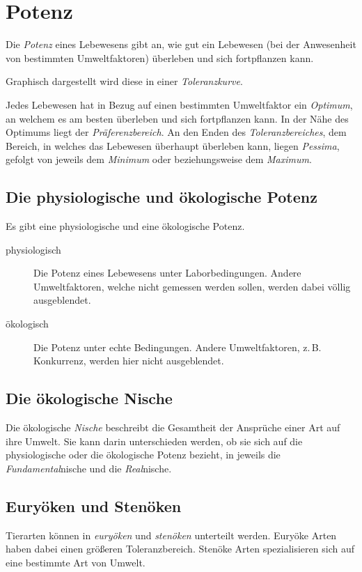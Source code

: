 \documentclass{article}
\begin{document}
\section{Potenz}
Die \emph{Potenz} eines Lebewesens gibt an, wie gut ein Lebewesen (bei der Anwesenheit von bestimmten Umweltfaktoren) überleben und sich fortpflanzen kann.
 
Graphisch dargestellt wird diese in einer \emph{Toleranzkurve}.
 
Jedes Lebewesen hat in Bezug auf einen bestimmten Umweltfaktor ein \emph{Optimum}, an welchem es am besten überleben und sich fortpflanzen kann. In der Nähe des Optimums liegt der \emph{Präferenzbereich}. An den Enden des \emph{Toleranzbereiches}, dem Bereich, in welches das Lebewesen überhaupt überleben kann, liegen \emph{Pessima}, gefolgt von jeweils dem \emph{Minimum} oder beziehungsweise dem \emph{Maximum}. 
 
\subsection{Die physiologische und ökologische Potenz}
Es gibt eine physiologische und eine ökologische Potenz.
\begin{description}
 \item[physiologisch] Die Potenz eines Lebewesens unter Laborbedingungen. Andere Umweltfaktoren, welche nicht gemessen werden sollen, werden dabei völlig ausgeblendet.
 \item[ökologisch] Die Potenz unter echte Bedingungen. Andere Umweltfaktoren, z.\,B. Konkurrenz, werden hier nicht ausgeblendet.
\end{description}  
 
\subsection{Die ökologische Nische}
Die ökologische \emph{Nische} beschreibt die Gesamtheit der Ansprüche einer Art auf ihre Umwelt. Sie kann darin unterschieden werden, ob sie sich auf die physiologische oder die ökologische Potenz bezieht, in jeweils die \emph{Fundamental}nische und die \emph{Real}nische.
 
\subsection{Euryöken und Stenöken}
Tierarten können in \emph{euryöken} und \emph{stenöken} unterteilt werden. Euryöke Arten haben dabei einen größeren Toleranzbereich. Stenöke Arten spezialisieren sich auf eine bestimmte Art von Umwelt.
 
\end{document}
